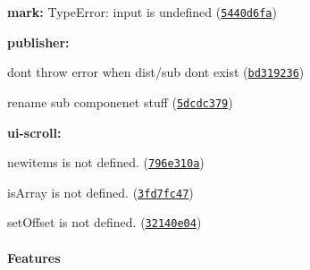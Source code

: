 \begin{DoxyItemize}
\item {\bfseries mark\+:} Type\+Error\+: input is undefined (\href{http://github.com/angular-ui/ui-utils/commit/5440d6fa8514ee86efc480b0abbf66cf244889ad}{\tt 5440d6fa})
\item {\bfseries publisher\+:}
\begin{DoxyItemize}
\item don\textquotesingle{}t throw error when \textquotesingle{}dist/sub\textquotesingle{} don\textquotesingle{}t exist (\href{http://github.com/angular-ui/ui-utils/commit/bd31923668c0ea80311b9dbe7d72bfbe55956325}{\tt bd319236})
\item rename sub componenet stuff (\href{http://github.com/angular-ui/ui-utils/commit/5dcdc3794efe66112522415aafe9ebe965a274f6}{\tt 5dcdc379})
\end{DoxyItemize}
\item {\bfseries ui-\/scroll\+:}
\begin{DoxyItemize}
\item \textquotesingle{}newitems\textquotesingle{} is not defined. (\href{http://github.com/angular-ui/ui-utils/commit/796e310a26ac43a248c0c732877242890fdda2be}{\tt 796e310a})
\item \textquotesingle{}is\+Array\textquotesingle{} is not defined. (\href{http://github.com/angular-ui/ui-utils/commit/3fd7fc47de7d05460a55ca42e4afec60d8e8cc4d}{\tt 3fd7fc47})
\item \textquotesingle{}set\+Offset\textquotesingle{} is not defined. (\href{http://github.com/angular-ui/ui-utils/commit/32140e04be176c4b2a5954d2cf8e9ec3c48a6f5c}{\tt 32140e04})
\end{DoxyItemize}
\end{DoxyItemize}

\paragraph*{Features}


